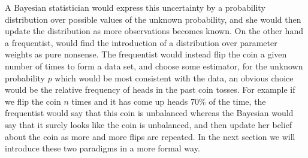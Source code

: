 A Bayesian statistician would express this uncertainty by a probability distribution over possible values of the unknown probability, and she would then update the distribution as more observations becomes known. On the other hand a frequentist, would find the introduction of a distribution over parameter weights as pure nonsense. The frequentist would instead flip the coin a given number of times to form a data set, and choose some estimator, for the unknown probability $p$ which would be most consistent with the data, an obvious choice would be the relative frequency of heads in the past coin tosses. For example if we flip the coin $n$ times and it has come up heads 70\% of the time, the frequentist would say that this coin is unbalanced whereas the Bayesian would say that it surely looks like the coin is unbalanced, and then update her belief about the coin as more and more flips are repeated. In the next section we will introduce these two paradigms in a more formal way.



